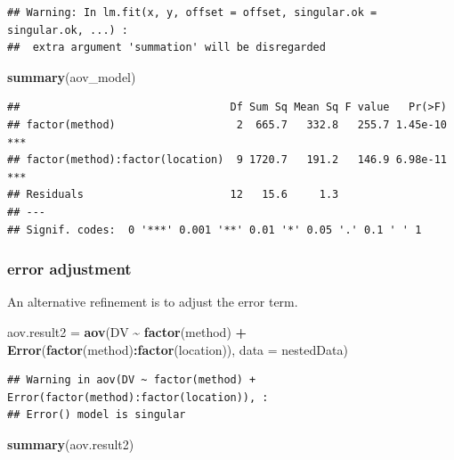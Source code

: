 \documentclass[
]{ctexart}
\newenvironment{Shaded}{\begin{snugshade}}{\end{snugshade}}
\newcommand{\AttributeTok}[1]{\textcolor[rgb]{0.13,0.29,0.53}{#1}}
\newcommand{\FunctionTok}[1]{\textcolor[rgb]{0.13,0.29,0.53}{\textbf{#1}}}
\newcommand{\NormalTok}[1]{#1}
\newcommand{\OtherTok}[1]{\textcolor[rgb]{0.56,0.35,0.01}{#1}}
\newcommand{\SpecialCharTok}[1]{\textcolor[rgb]{0.81,0.36,0.00}{\textbf{#1}}}
\begin{document}
\begin{verbatim}
## Warning: In lm.fit(x, y, offset = offset, singular.ok = singular.ok, ...) :
##  extra argument 'summation' will be disregarded
\end{verbatim}

\begin{Shaded}
\begin{Highlighting}[]
\FunctionTok{summary}\NormalTok{(aov\_model)}
\end{Highlighting}
\end{Shaded}

\begin{verbatim}
##                                 Df Sum Sq Mean Sq F value   Pr(>F)    
## factor(method)                   2  665.7   332.8   255.7 1.45e-10 ***
## factor(method):factor(location)  9 1720.7   191.2   146.9 6.98e-11 ***
## Residuals                       12   15.6     1.3                     
## ---
## Signif. codes:  0 '***' 0.001 '**' 0.01 '*' 0.05 '.' 0.1 ' ' 1
\end{verbatim}

\hypertarget{error-adjustment}{%
\subsubsection{error adjustment}\label{error-adjustment}}

An alternative refinement is to adjust the error term.

\begin{Shaded}
\begin{Highlighting}[]
\NormalTok{aov.result2 }\OtherTok{=} \FunctionTok{aov}\NormalTok{(DV }\SpecialCharTok{\textasciitilde{}} \FunctionTok{factor}\NormalTok{(method) }\SpecialCharTok{+} 
                    \FunctionTok{Error}\NormalTok{(}\FunctionTok{factor}\NormalTok{(method)}\SpecialCharTok{:}\FunctionTok{factor}\NormalTok{(location)),}
                  \AttributeTok{data =}\NormalTok{ nestedData)}
\end{Highlighting}
\end{Shaded}

\begin{verbatim}
## Warning in aov(DV ~ factor(method) + Error(factor(method):factor(location)), :
## Error() model is singular
\end{verbatim}

\begin{Shaded}
\begin{Highlighting}[]
\FunctionTok{summary}\NormalTok{(aov.result2)}
\end{Highlighting}
\end{Shaded}
\end{document}
